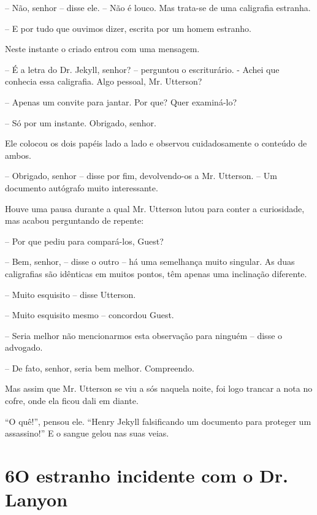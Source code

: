-- Não, senhor -- disse ele. -- Não é louco.  Mas trata-se de uma
caligrafia estranha.

-- E por tudo que ouvimos dizer, escrita por um homem estranho.

Neste instante o criado entrou com uma mensagem.

-- É a letra do Dr. Jekyll, senhor? -- perguntou o escriturário. - Achei
que conhecia essa caligrafia.  Algo pessoal, Mr. Utterson?

-- Apenas um convite para jantar.  Por que?  Quer examiná-lo?

-- Só por um instante.  Obrigado, senhor.

Ele colocou os dois papéis lado a lado e observou cuidadosamente o
conteúdo de ambos.

-- Obrigado, senhor -- disse por fim, devolvendo-os a Mr. Utterson. -- Um
documento autógrafo muito interessante.

Houve uma pausa durante a qual Mr. Utterson lutou para conter a
curiosidade, mas acabou perguntando de repente:

-- Por que pediu para compará-los, Guest?

-- Bem, senhor, -- disse o outro -- há uma semelhança muito singular.  As
duas caligrafias são idênticas em muitos pontos, têm apenas uma
inclinação diferente.

-- Muito esquisito -- disse Utterson.

-- Muito esquisito mesmo -- concordou Guest.

-- Seria melhor não mencionarmos esta observação para ninguém -- disse o
advogado.

-- De fato, senhor, seria bem melhor.  Compreendo.

Mas assim que Mr. Utterson se viu a sós naquela noite, foi logo trancar
a nota no cofre, onde ela ficou dali em diante.

“O quê!”, pensou ele.  “Henry Jekyll falsificando um documento para
proteger um assassino!”  E o sangue gelou nas suas veias. 


\chapter[6 -- O estranho incidente com o Dr. Lanyon]{6\break O estranho incidente com o Dr. Lanyon}


